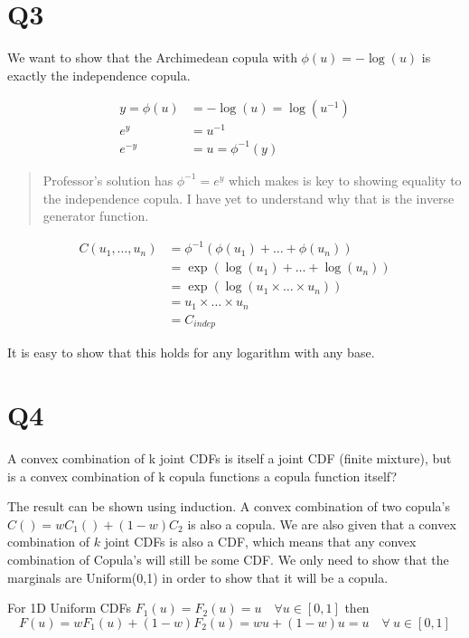 \documentclass[
  oneside]{book}
\begin{document}
\hypertarget{q3-2}{%
\section{Q3}\label{q3-2}}

We want to show that the Archimedean copula with \(\phi(u) = -\log(u)\) is exactly the independence copula.

\[
\begin{aligned}
y = \phi(u) &= -\log(u) = \log(u^{-1})\\
e^{y} &= u^{-1}\\
e^{-y} &= u = \phi ^{-1}(y)
\end{aligned}
\]

\begin{quote}
Professor's solution has \(\phi ^{-1}=e^{y}\) which makes is key to showing equality to the independence copula. I have yet to understand why that is the inverse generator function.
\end{quote}

\[
\begin{aligned}
C(u_{1}, \dots, u_{n}) &= \phi ^{-1}(\phi(u_{1})+\dots+\phi(u_{n}))\\
&= \exp(\log(u_{1})+\dots + \log(u_{n}))\\
&= \exp(\log(u_{1} \times\dots \times u_{n}))\\
&= u_{1}\times\dots \times u_{n}\\
&= C_{indep}
\end{aligned}
\]

It is easy to show that this holds for any logarithm with any base.

\hypertarget{q4-2}{%
\section{Q4}\label{q4-2}}

A convex combination of k joint CDFs is itself a joint CDF (finite mixture), but is a convex combination of k copula functions a copula function itself?

The result can be shown using induction. A convex combination of two copula's \(C() = wC_{1}()+(1-w)C_{2}\) is also a copula. We are also given that a convex combination of \(k\) joint CDFs is also a CDF, which means that any convex combination of Copula's will still be some CDF. We only need to show that the marginals are Uniform(0,1) in order to show that it will be a copula.

For 1D Uniform CDFs \(F_{1}(u) = F_{2}(u) = u \quad \forall u \in [0,1]\) then
\[
F(u) = wF_{1}(u)+(1-w)F_{2}(u) = wu+(1-w)u = u \quad \forall\ u \in [0,1]
\]
\end{document}

